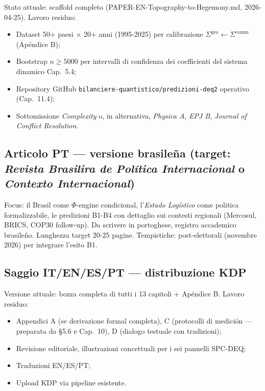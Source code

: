 Stato attuale: scaffold completo (PAPER-EN-Topography-to-Hegemony.md,
2026-04-25). Lavoro residuo:

\begin{itemize}
\tightlist
\item
  Dataset 50+ paesi $\times$ 20+ anni (1995-2025) per calibrazione
  \(\Sigma^{\text{geo}} \leftarrow \Sigma^{\text{comm}}\) (Apéndice B);
\item
  Bootstrap \(n \geq 5000\) per intervalli di confidenza dei
  coefficienti del sistema dinamico Cap.~5.4;
\item
  Repository GitHub \texttt{bilanciere-quantistico/predizioni-deq2}
  operativo (Cap.~11.4);
\item
  Sottomissione \emph{Complexity} o, in alternativa, \emph{Physica A},
  \emph{EPJ B}, \emph{Journal of Conflict Resolution}.
\end{itemize}

\subsection{\texorpdfstring{Articolo PT --- versione brasileña (target:
\emph{Revista Brasilira de Política Internacional} o \emph{Contexto
Internacional})}{Articolo PT --- versione brasileña (target: Revista Brasilira de Política Internacional o Contexto Internacional)}}\label{articolo-pt-versione-brasileña-target-revista-brasileira-de-poluxedtica-internacional-o-contexto-internacional}

Focus: il Brasil come \(\Phi\)-engine condicional, l'\emph{Estado
Logístico} come politica formalizzabile, le predizioni B1-B4 con
dettaglio sui contesti regionali (Mercosul, BRICS, COP30 follow-up). Da
scrivere in portoghese, registro accademico brasileño. Lunghezza target
\(20\)-\(25\) pagine. Tempistiche: post-elettorali (novembre 2026) per
integrare l'esito B1.

\subsection{Saggio IT/EN/ES/PT --- distribuzione
KDP}\label{saggio-itenespt-distribuzione-kdp}

Versione attuale: bozza completa di tutti i 13 capitoli + Apéndice B.
Lavoro residuo:

\begin{itemize}
\tightlist
\item
  Appendici A (se derivazione formal completa), C (protocolli di
  medición --- preparata da \S{}5.6 e Cap.~10), D (dialogo testuale con
  tradizioni);
\item
  Revisione editoriale, illustrazioni concettuali per i sei pannelli
  SPC-DEQ;
\item
  Traduzioni EN/ES/PT;
\item
  Upload KDP via pipeline esistente.
\end{itemize}



